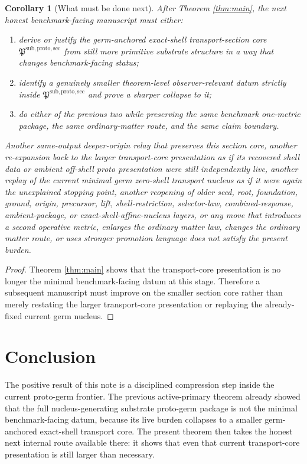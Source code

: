 \documentclass[11pt]{article}
\newcommand{\ProtoSectionCore}{\mathfrak P^{\mathrm{sub,proto,sec}}}
\newtheorem{corollary}{Corollary}
\begin{document}
\begin{corollary}[What must be done next]
\label{cor:next}
After Theorem \ref{thm:main}, the next honest benchmark-facing manuscript must either:
\begin{enumerate}
    \item derive or justify the germ-anchored exact-shell transport-section core \(\ProtoSectionCore\) from still more primitive substrate structure in a way that changes benchmark-facing status;
    \item identify a genuinely smaller theorem-level observer-relevant datum strictly inside \(\ProtoSectionCore\) and prove a sharper collapse to it;
    \item do either of the previous two while preserving the same benchmark one-metric package, the same ordinary-matter route, and the same claim boundary.
\end{enumerate}
Another same-output deeper-origin relay that preserves this section core, another re-expansion back to the larger transport-core presentation as if its recovered shell data or ambient off-shell proto presentation were still independently live, another replay of the current minimal germ zero-shell transport nucleus as if it were again the unexplained stopping point, another reopening of older seed, root, foundation, ground, origin, precursor, lift, shell-restriction, selector-law, combined-response, ambient-package, or exact-shell-affine-nucleus layers, or any move that introduces a second operative metric, enlarges the ordinary matter law, changes the ordinary matter route, or uses stronger promotion language does not satisfy the present burden.
\end{corollary}

\begin{proof}
Theorem \ref{thm:main} shows that the transport-core presentation is no longer the minimal benchmark-facing datum at this stage. Therefore a subsequent manuscript must improve on the smaller section core rather than merely restating the larger transport-core presentation or replaying the already-fixed current germ nucleus.
\end{proof}

\section{Conclusion}

The positive result of this note is a disciplined compression step inside the current proto-germ frontier. The previous active-primary theorem already showed that the full nucleus-generating substrate proto-germ package is not the minimal benchmark-facing datum, because its live burden collapses to a smaller germ-anchored exact-shell transport core. The present theorem then takes the honest next internal route available there: it shows that even that current transport-core presentation is still larger than necessary.
\end{document}
